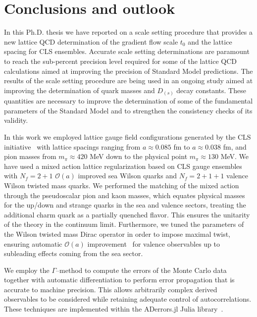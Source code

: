 \chapter*{Conclusions and outlook}
\label{ch_conclu}

In this Ph.D. thesis we have reported on a scale setting procedure that provides a new lattice QCD determination of the gradient flow scale $t_0$ and the lattice spacing for CLS ensembles. Accurate scale setting determinations are paramount to reach the sub-percent precision level required for some of the lattice QCD calculations aimed at improving the precision of Standard Model predictions. The results of the scale setting procedure are being used in an ongoing study aimed at improving the determination of quark masses and $D_{(s)}$ decay constants. These quantities are necessary to improve the determination of some of the fundamental parameters of the Standard Model and to strengthen the consistency checks of its validity.

In this work we employed lattice gauge field configurations generated by the CLS initiative~\citep{Bruno:2014jqa,Mohler:2017wnb} with lattice spacings ranging from $a\approx0.085$ fm to $a\approx0.038$ fm, and pion masses from $m_{\pi}\approx420$ MeV down to the physical point $m_{\pi}\approx130$ MeV. We have used a mixed action lattice regularization based on CLS gauge ensembles with $N_f=2+1$ $\mathcal{O}(a)$ improved sea Wilson quarks and $N_f=2+1+1$ valence Wilson twisted mass quarks. We performed the matching of the mixed action through the pseudoscalar pion and kaon masses, which equates physical masses for the up/down and strange quarks in the sea and valence sectors, treating the additional charm quark as a partially quenched flavor. This ensures the unitarity of the theory in the continuum limit. Furthermore, we tuned the parameters of the Wilson twisted mass Dirac operator in order to impose maximal twist, ensuring automatic $\mathcal{O}(a)$ improvement~\citep{Frezzotti:2003ni,Shindler:2007vp} for valence observables up to subleading effects coming from the sea sector.

We employ the $\Gamma$--method to compute the errors of the Monte Carlo data together with automatic differentiation to perform error propagation that is accurate to machine precision. This allows arbitrarily complex derived observables to be considered while retaining adequate control of autocorrelations. These techniques are implemented within the ADerrors.jl Julia library~\citep{Ramos:2018vgu,Ramos:2020scv}. 

